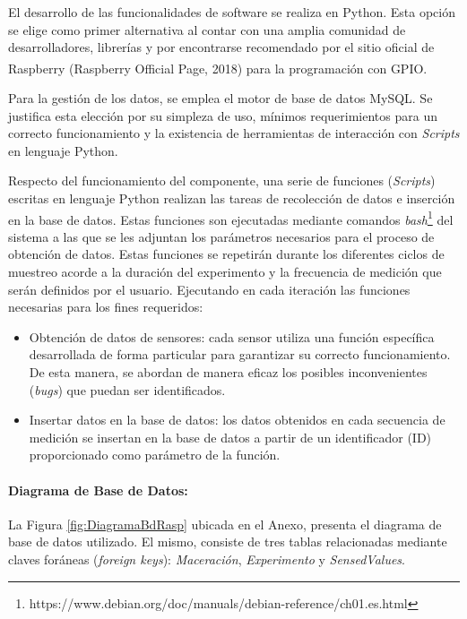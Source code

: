                \par El desarrollo de las funcionalidades de software se realiza en Python. Esta opción se elige como primer alternativa al contar con una amplia comunidad de desarrolladores, librerías y por encontrarse recomendado por el sitio oficial de Raspberry\textsuperscript{\textregistered} (Raspberry\textsuperscript{\textregistered} Official Page, 2018) para la programación con GPIO.
                
                \par Para la gestión de los datos, se emplea el motor de base de datos MySQL. Se justifica esta elección por su simpleza de uso, mínimos requerimientos para un correcto funcionamiento y la existencia de herramientas de interacción con \textit{Scripts} en lenguaje Python.
                
                \par Respecto del funcionamiento del componente, una serie de funciones (\textit{Scripts}) escritas en lenguaje Python realizan las tareas de recolección de datos e inserción en la base de datos. Estas funciones son ejecutadas mediante comandos \textit{bash}\footnote{https://www.debian.org/doc/manuals/debian-reference/ch01.es.html} del sistema a las que se les adjuntan los parámetros necesarios para el proceso de obtención de datos. Estas funciones se repetirán durante los diferentes ciclos de muestreo acorde a la duración del experimento y la frecuencia de medición que serán definidos por el usuario. Ejecutando en cada iteración las funciones necesarias para los fines requeridos:
                    
                    \begin{itemize}
                        \item Obtención de datos de sensores: cada sensor utiliza una función específica desarrollada de forma particular para garantizar su correcto funcionamiento. De esta manera, se abordan de manera eficaz los posibles inconvenientes (\textit{bugs}) que puedan ser identificados.
                        
                        \item Insertar datos en la base de datos: los datos obtenidos en cada secuencia de medición se insertan en la base de datos a partir de un identificador (ID) proporcionado como parámetro de la función.
                    \end{itemize}
                
                \paragraph{Diagrama de Base de Datos:} La Figura \ref{fig:DiagramaBdRasp} ubicada en el Anexo, presenta el diagrama de base de datos utilizado. El mismo, consiste de tres tablas relacionadas mediante claves foráneas (\textit{foreign keys}): \textit{Maceración}, \textit{Experimento} y \textit{SensedValues}. 
                
